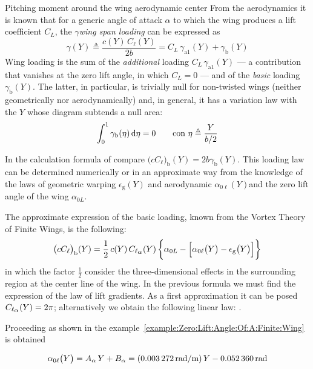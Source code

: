 \documentclass[[12pt,twoside]{book}
\begin{document}
\begin{myExampleX}{Pitching moment around the wing aerodynamic center}{}
\smallskip
From the aerodynamics it is known that for a generic angle of attack $\alpha$ to which the wing produces a lift
coefficient $C_L$,
the $\gamma$\emph{wing span loading} can be expressed as
\[
\gamma(Y) \triangleq \frac{c(Y) \, C_\ell (Y)}{2 b} = C_L \, \gamma_{\mathrm{a}1}(Y) + \gamma_\mathrm{b}(Y) 
\]
Wing loading is the sum of the  \emph{additional} loading $C_L \, \gamma_{\mathrm{a}1}(Y)$
--- a contribution that vanishes at the zero lift angle, in which $C_L=0$ ---
and of the \emph{basic} loading $\gamma_\mathrm{b}(Y)$.
The latter, in particular, is trivially null for non-twisted wings (neither geometrically nor aerodynamically)
and, in general, it has a variation law with the $Y$ whose diagram subtends a null area:
\[
\int_0^{1} \gamma_\mathrm{b}(\eta) \diff{\eta} = 0 \qquad \text{con $\eta \triangleq \dfrac{Y}{b/2}$}
\]

In the calculation formula of 
compare $\big(cC_{\ell}\big)_\mathrm{b}(Y) = 2b\gamma_\mathrm{b}(Y)$.
This loading law can be determined numerically or in an approximate way
from the knowledge of the laws of geometric warping $\epsilon_\mathrm{g}(Y)$ and aerodynamic
$\alpha_{0\ell}(Y)$and the zero lift angle of the wing $\alpha_{0L}$.

The approximate expression of the basic loading, known from the Vortex Theory of Finite Wings, is the following:
\[
\big(cC_{\ell}\big)_\mathrm{b}(Y)
  = \frac{1}{2} \, c(Y) \, C_{\ell_\mathlarger{\alpha}}(Y) \,
    \bigg\{ \alpha_{0L} - \Big[ \alpha_{0\ell}\big(Y\big) - \epsilon_\mathrm{g}\big(Y\big) \Big] \bigg\}
\]
in which the factor $\frac{1}{2}$ consider the three-dimensional effects in the surrounding region
at the center line of the wing.
%
In the previous formula we must find the expression of the law of lift gradients.
As a first approximation it can be posed
$C_{\ell_\mathlarger{\alpha}} (Y)=2\pi$; alternatively we obtain the following linear law:
.

Proceeding as shown in the example~\ref{example:Zero:Lift:Angle:Of:A:Finite:Wing}
is obtained

\[
\alpha_{0\ell} \big( Y \big) = A_{\alpha} \, Y + B_{\alpha}
  = (\SI[round-precision=5]{\myCoeffAAeroTwistWingRADMT}{\radian/\metre}) \, Y
    \SI[round-precision=4]{\myAlphaZeroLiftRootWingRAD}{\radian}
\]


\end{myExampleX}
\end{document}

